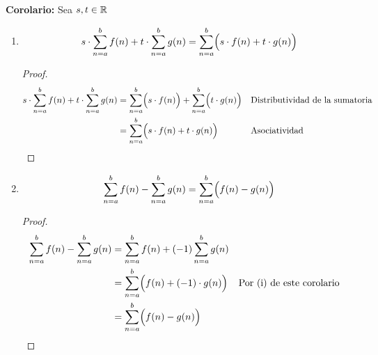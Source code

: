 \begin{enumerate}[label=\alph*)]
    \textbf{Corolario:} Sea $s,t\in \mathbb{R}$ \begin{enumerate}[label=\roman*)]  
      \item \[s\cdot \sum_{n=a}^{b} f(n) + t\cdot \sum_{n=a}^{b} g(n) = \sum_{n=a}^{b} \Bigl(s\cdot f(n) + t\cdot g(n)\Bigr)\]
      \begin{proof}
        \begin{align*}
          s\cdot \sum_{n=a}^{b} f(n) + t\cdot \sum_{n=a}^{b} g(n) &= \sum_{n=a}^{b} \Bigl(s\cdot f(n)\Bigr) + \sum_{n=a}^{b} \Bigl(t\cdot g(n)\Bigr) && \text{Distributividad de la sumatoria}\\
          &= \sum_{n=a}^{b} \Bigl(s\cdot f(n) + t\cdot g(n)\Bigr) && \text{Asociatividad} \qedhere
        \end{align*}
      \end{proof}
    
      \item \[\sum_{n=a}^{b} f(n) - \sum_{n=a}^{b} g(n) = \sum_{n=a}^{b} \Bigl(f(n) - g(n)\Bigr)\]
      \begin{proof}
        \begin{align*}
          \sum_{n=a}^{b} f(n) - \sum_{n=a}^{b} g(n) &= \sum_{n=a}^{b} f(n) + (-1)\sum_{n=a}^{b} g(n)\\
          &= \sum_{n=a}^{b} \Bigl(f(n) + (-1)\cdot g(n)\Bigr) && \text{Por (i) de este corolario}\\
          &= \sum_{n=a}^{b} \Bigl(f(n) - g(n)\Bigr)
        \end{align*}
      \end{proof}
    \end{enumerate}

  
      
      

\end{enumerate}
